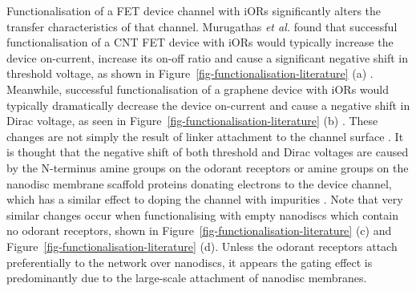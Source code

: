 \documentclass[
  a4paper,
]{scrbook}
\begin{document}
Functionalisation of a FET device channel with iORs significantly alters
the transfer characteristics of that channel. Murugathas \emph{et al.}
found that successful functionalisation of a CNT FET device with iORs
would typically increase the device on-current, increase its on-off
ratio and cause a significant negative shift in threshold voltage, as
shown in Figure~\ref{fig-functionalisation-literature} (a)
\autocite{Murugathas2019a}. Meanwhile, successful functionalisation of a
graphene device with iORs would typically dramatically decrease the
device on-current and cause a negative shift in Dirac voltage, as seen
in Figure~\ref{fig-functionalisation-literature} (b)
\autocite{Murugathas2020}. These changes are not simply the result of
linker attachment to the channel surface \autocite{Murugathas2019a}. It
is thought that the negative shift of both threshold and Dirac voltages
are caused by the N-terminus amine groups on the odorant receptors or
amine groups on the nanodisc membrane scaffold proteins donating
electrons to the device channel, which has a similar effect to doping
the channel with impurities
\autocite{Bradley2004,Murugathas2019a,Murugathas2020}. Note that very
similar changes occur when functionalising with empty nanodiscs which
contain no odorant receptors, shown in
Figure~\ref{fig-functionalisation-literature} (c) and
Figure~\ref{fig-functionalisation-literature} (d). Unless the odorant
receptors attach preferentially to the network over nanodiscs, it
appears the gating effect is predominantly due to the large-scale
attachment of nanodisc membranes.
\end{document}
